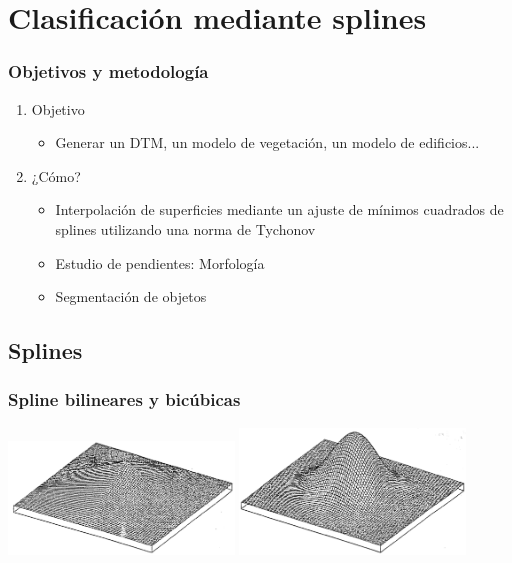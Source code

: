 \section{Clasificación mediante splines}
\begin{frame}
  \frametitle{Objetivos y metodología}
  \begin{enumerate}[<+->]
    \item Objetivo
    \begin{itemize}
       \item Generar un DTM, un modelo de \alert<2>{vegetación}, un modelo de
         \alert<2>{edificios}...
    \end{itemize}
    \item ¿Cómo?
    \begin{itemize}
      \item Interpolación de \alert<4>{superficies} mediante un ajuste de mínimos
            cuadrados de splines utilizando una norma de Tychonov
          \item Estudio de pendientes: \alert<5>{Morfología}
          \item \alert<6>{Segmentación} de objetos
    \end{itemize}
  \end{enumerate}
\end{frame}
\subsection{Splines}
\begin{frame}
    \frametitle{Spline bilineares y bicúbicas}
    \begin{center}
        \includegraphics[width=0.45\textwidth]{images/bilinear_spline.jpg}
        \includegraphics[width=0.45\textwidth]{images/bicubic_spline.jpg}
    \end{center}
\end{frame}
